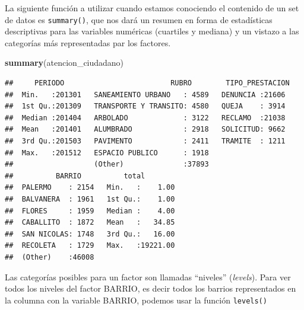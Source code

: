 \documentclass[spanish,]{book}
\newenvironment{Shaded}{\begin{snugshade}}{\end{snugshade}}
\newcommand{\KeywordTok}[1]{\textcolor[rgb]{0.13,0.29,0.53}{\textbf{#1}}}
\newcommand{\NormalTok}[1]{#1}
\newcommand{\OperatorTok}[1]{\textcolor[rgb]{0.81,0.36,0.00}{\textbf{#1}}}
\begin{document}
La siguiente función a utilizar cuando estamos conociendo el contenido de un set de datos es \texttt{summary()}, que nos dará un resumen en forma de estadísticas descriptivas para las variables numéricas (cuartiles y mediana) y un vistazo a las categorías más representadas par los factores.

\begin{Shaded}
\begin{Highlighting}[]
\KeywordTok{summary}\NormalTok{(atencion_ciudadano)}
\end{Highlighting}
\end{Shaded}

\begin{verbatim}
##     PERIODO                         RUBRO        TIPO_PRESTACION 
##  Min.   :201301   SANEAMIENTO URBANO   : 4589   DENUNCIA :21606  
##  1st Qu.:201309   TRANSPORTE Y TRANSITO: 4580   QUEJA    : 3914  
##  Median :201404   ARBOLADO             : 3122   RECLAMO  :21038  
##  Mean   :201401   ALUMBRADO            : 2918   SOLICITUD: 9662  
##  3rd Qu.:201503   PAVIMENTO            : 2411   TRAMITE  : 1211  
##  Max.   :201512   ESPACIO PUBLICO      : 1918                    
##                   (Other)              :37893                    
##          BARRIO          total         
##  PALERMO    : 2154   Min.   :    1.00  
##  BALVANERA  : 1961   1st Qu.:    1.00  
##  FLORES     : 1959   Median :    4.00  
##  CABALLITO  : 1872   Mean   :   34.85  
##  SAN NICOLAS: 1748   3rd Qu.:   16.00  
##  RECOLETA   : 1729   Max.   :19221.00  
##  (Other)    :46008
\end{verbatim}

Las categorías posibles para un factor son llamadas ``niveles'' (\emph{levels}). Para ver todos los niveles del factor BARRIO, es decir todos los barrios representados en la columna con la variable BARRIO, podemos usar la función \texttt{levels()}

\begin{Shaded}
\end{Shaded}
\end{document}

